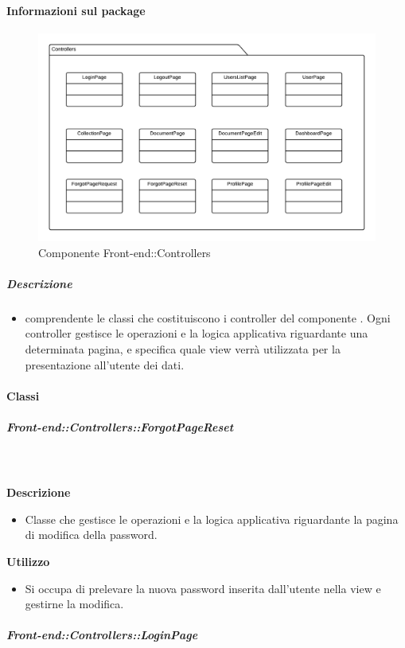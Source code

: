   \paragraph{Informazioni sul package}
    \begin{figure}[H] 
      \begin{center} 
        \includegraphics[width=\textwidth]{packages/Front-end::Controllers.png}  
        \caption{Componente Front-end::Controllers}
      \end{center}  
    \end{figure} 
  \subparagraph{Descrizione} 
    \begin{itemize}
    \item[]  comprendente le classi che costituiscono i controller del componente . Ogni controller gestisce le operazioni e la logica applicativa riguardante una determinata pagina, e specifica quale view verrà utilizzata per la presentazione all'utente dei dati.
    \end{itemize} 
    \paragraph{Classi}
      \subparagraph{Front-end::Controllers::ForgotPageReset}
        
        \textbf{\\ \\ Descrizione} 
          \begin{itemize}
            \item[] Classe che gestisce le operazioni e la logica applicativa riguardante la pagina di modifica della password.
          \end{itemize}      
        \textbf{Utilizzo}  
          \begin{itemize}
            \item[] Si occupa di prelevare la nuova  password inserita dall'utente nella view e gestirne la modifica.
          \end{itemize}
      \subparagraph{Front-end::Controllers::LoginPage}
        

